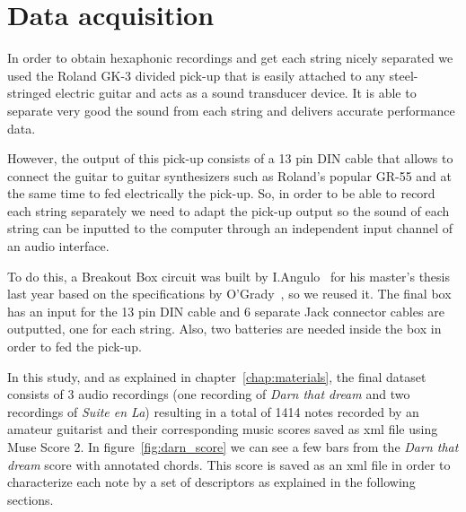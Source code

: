 \section{Data acquisition}
In order to obtain hexaphonic recordings and get each string nicely separated we used the Roland GK-3 divided pick-up that is easily attached to any steel-stringed electric guitar and acts as a sound transducer device. It is able to separate very good the sound from each string and delivers accurate performance data.

However, the output of this pick-up consists of a 13 pin DIN cable that allows to connect the guitar to guitar synthesizers such as Roland's popular GR-55 and at the same time to fed electrically the pick-up. So, in order to be able to record each string separately we need to adapt the pick-up output so the sound of each string can be inputted to the computer through an independent input channel of an audio interface.

To do this, a Breakout Box circuit was built by I.Angulo~\cite{Angulo2016} for his master's thesis last year based on the specifications by O'Grady~\cite{OGrady2009}, so we reused it. The final box has an input for the 13 pin DIN cable and 6 separate Jack connector cables are outputted, one for each string. Also, two batteries are needed inside the box in order to fed the pick-up. 

In this study, and as explained in chapter~\ref{chap:materials}, the final dataset consists of 3 audio recordings (one recording of \textit{Darn that dream} and two recordings of \textit{Suite en La}) resulting in a total of 1414 notes recorded by an amateur guitarist and their corresponding music scores saved as xml file using Muse Score 2. In figure~\ref{fig:darn_score} we can see a few bars from the \textit{Darn that dream} score with annotated chords. This score is saved as an xml file in order to characterize each note by a set of descriptors as explained in the following sections.  

